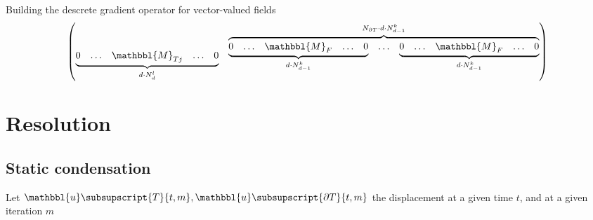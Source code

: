 \begin{infobox}{Building the descrete gradient operator for vector-valued fields}
\begin{equation}
\begin{aligned}
\begin{pmatrix}
                        \begin{aligned}
                            \underbrace{
                                \begin{aligned}
                                    0 && \dots && \mathbbl{M}_{Tj} && \dots && 0
                                \end{aligned}
                            }_{d \cdot N_d^l}
                            &&
                            \overbrace{
                                \begin{aligned}
                                    \underbrace{
                                        \begin{aligned}
                                            0 && \dots && \mathbbl{M}_F && \dots && 0
                                        \end{aligned}
                                    }_{d \cdot N_{d-1}^k}
                                    &&
                                    \dots
                                    &&
                                    \underbrace{
                                        \begin{aligned}
                                            0 && \dots && \mathbbl{M}_F && \dots && 0
                                        \end{aligned}
                                    }_{d \cdot N_{d-1}^k}
                                \end{aligned}
                            }^{N_{\partial T} \cdot d \cdot N_{d-1}^k}
                        \end{aligned}
                    \end{pmatrix}
                \end{aligned}
            \end{equation}
        \end{infobox}
    
\section{Resolution}

    \subsection{Static condensation}

        Let $\mathbbl{u}\subsupscript{{T}}{t,m}, \mathbbl{u}\subsupscript{{\partial T}}{t,m}$ the displacement at a given time $t$, and at a given iteration $m$

